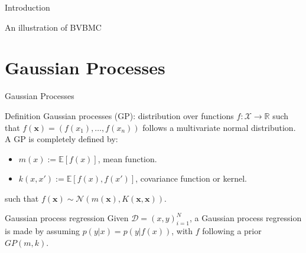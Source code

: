 \documentclass[pdf]{beamer}
\def \Ev {{\mathbb E}}
\begin{document}
\begin{frame}{Introduction}
\begin{block}{An illustration of BVBMC}
{
}
\end{block}
\end{frame}

\section{Gaussian Processes}
\begin{frame}{Gaussian Processes}
\begin{block}{Definition}
Gaussian processes (GP): distribution over functions $f:\mathcal{X} \to \mathbb{R}$ such that $f(\mathbf{x}) = (f(x_1),\ldots,f(x_n))$ follows a multivariate normal distribution. A GP is completely defined by:
\begin{itemize}
	\item $m(x) := \Ev[f(x)]$, mean function.
	\item $k(x,x') := \Ev[f(x),f(x')]$, covariance function or kernel.
\end{itemize}
such that $f(\mathbf{x}) \sim \mathcal{N}(m(\mathbf{x}),K(\mathbf{x},\mathbf{x}))$.
\end{block}
\pause
\begin{block}{Gaussian process regression}
Given $\mathcal{D} = {(x,y)}_{i=1}^N$, a Gaussian process regression is made by assuming $p(y|x) = p(y|f(x))$, with $f$ following a prior $GP(m,k)$.
\end{block}

\end{frame}
\end{document}
